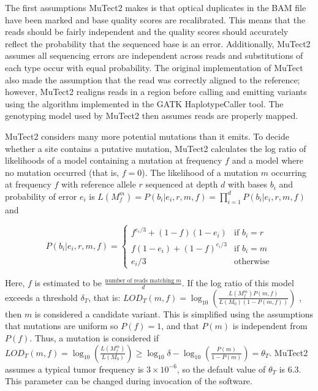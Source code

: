 The first assumptions MuTect2 makes is that optical duplicates in the BAM file have been marked and base quality scores are recalibrated. This means that the reads should be fairly independent and the quality scores should accurately reflect the probability that the sequenced base is an error. Additionally, MuTect2 assumes all sequencing errors are independent across reads and substitutions of each type occur with equal probability.
The original implementation of MuTect also made the assumption that the read was correctly aligned to the reference; however, MuTect2 realigns reads in a region before calling and emitting variants using the algorithm implemented in the GATK HaplotypeCaller tool. The genotyping model used by MuTect2 then assumes reads are properly mapped.



MuTect2 considers many more potential mutations than it emits. To decide whether a site contains a putative mutation, MuTect2 calculates the log ratio of likelihoods of a model containing a mutation at frequency $f$ and a model where no mutation occurred (that is, $f = 0$). The likelihood of a mutation $m$ occurring at frequency $f$ with reference allele $r$ sequenced at depth $d$ with bases $b_i$ and probability of error $e_i$ is $L(M_f^m)=P({b_i}|{e_i},r,m,f)=\prod_{i=1}^{d} P(b_i|e_i,r,m,f)$ and 

$$
P(b_i|e_i,r,m,f)=
\begin{cases}
f^{e_i/3}+(1-f)(1-e_i) & \text{if } b_i=r \\
f(1-e_i) + (1-f)^{e_i/3} & \text{if } b_i=m \\
e_i/3 & \text{otherwise}
\end{cases}
$$

Here, $f$ is estimated to be $\frac{\text{number of reads matching }m}{d}$.
If the log ratio of this model exceeds a threshold $\delta{}_T$, that is: $LOD_T(m,f)=\log_{10} \left(\frac{L(M_f^m)P(m,f)}{L(M_0)(1-P(m,f))}\right)$ , then $m$ is considered a candidate variant. This is simplified using the assumptions that mutations are uniform so $P(f)=1$, and that $P(m)$ is independent from $P(f)$. Thus, a mutation is considered if $LOD_T(m,f)=\log_{10} \left(\frac{L(M_f^m)}{L(M_0)}\right) \geq \log_{10} \delta{} - \log_{10}  \left(\frac{P(m)}{1-P(m)}\right) = \theta{}_T$. MuTect2 assumes a typical tumor frequency is $3 \times 10^{-6}$, so the default value of $\theta{}_T$ is 6.3. This parameter can be changed during invocation of the software.

